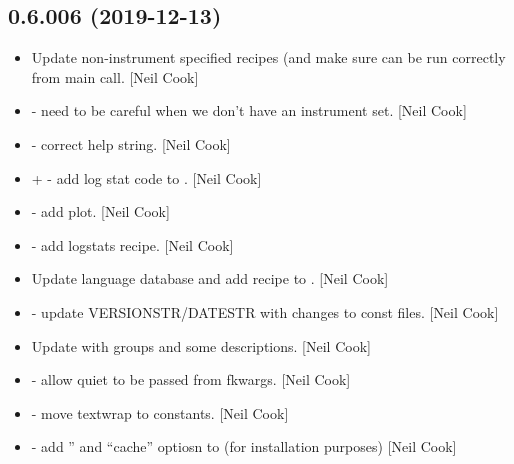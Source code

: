 \documentclass[a4paper,10pt,english]{report}
\begin{document}
\subsection{0.6.006 (2019-12-13)}
\label{\detokenize{misc/changelog:id12}}\begin{itemize}
\item {} 
Update non-instrument specified recipes (and make sure
 can be run correctly from main call. {[}Neil Cook{]}

\item {} 
 - need to be careful when we don’t have an instrument
set. {[}Neil Cook{]}

\item {} 
 - correct help string. {[}Neil Cook{]}

\item {} 
 +  - add
log stat code to . {[}Neil Cook{]}

\item {} 
 - add  plot. {[}Neil Cook{]}

\item {} 
 - add logstats recipe.
{[}Neil Cook{]}

\item {} 
Update language database and add recipe to . {[}Neil Cook{]}

\item {} 
 - update
VERSIONSTR/DATESTR with changes to const files. {[}Neil Cook{]}

\item {} 
Update  with groups and some
descriptions. {[}Neil Cook{]}

\item {} 
 - allow quiet to be passed from fkwargs.
{[}Neil Cook{]}

\item {} 
 - move textwrap to constants. {[}Neil Cook{]}

\item {} 
 - add ” and “cache”
optiosn to  (for installation purposes) {[}Neil Cook{]}


\end{itemize}
\end{document}
